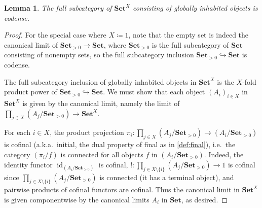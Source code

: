 \documentclass[11pt, oneside, article]{memoir}
\theoremstyle{plain}
\newtheorem{lemma}[theorem]{Lemma}
\theoremstyle{definition}
\theoremstyle{remark}
\DeclareMathOperator{\id}{id}
\newcommand{\bang}{\mathrm{!}}
\newcommand{\namedcat}[1]{\mathbf{#1}}
\newcommand{\Set}{\namedcat{Set}}
\newcommand{\setof}[1]{\{#1\}}
\newcommand{\xA}{A}
\newcommand{\xB}{B}
\newcommand{\xX}{X}
\begin{document}
\begin{lemma}\label{lem:setcodense}
  The full subcategory of $\Set^\xX$ consisting of globally inhabited objects is codense.
\end{lemma}
\begin{proof}
  For the special case where $\xX \coloneqq 1$, note that the empty
  set is indeed the canonical limit of $\Set_{>0} \to \Set$, where
  $\Set_{>0}$ is the full subcategory of $\Set$ consisting of nonempty
  sets, so the full subcategory inclusion
  $\Set_{>0} \hookrightarrow \Set$ is codense.

  The full subcategory inclusion of globally inhabited objects in
  $\Set^\xX$ is the $\xX$-fold product power of
  $\Set_{>0} \hookrightarrow \Set$. We must show that each object
  $(\xA_i)_{i \in \xX}$ in $\Set^\xX$ is given by the canonical limit,
  namely the limit of
  $\prod_{j \in \xX}(\xA_j/\Set_{>0}) \to \Set^{\xX}$.

  For each $i \in \xX$, the product projection
  $\pi_i \colon \prod_{j \in \xX}(\xA_j/\Set_{>0}) \to
  (\xA_i/\Set_{>0})$ is cofinal (a.k.a.\ initial, the dual property of
  final as in \cref{def:final}), i.e.\ the category $(\pi_i / f)$ is
  connected for all objects $f$ in $(\xA_i/\Set_{>0})$.
  Indeed, the identity functor $\id_{(\xA_i/\Set_{>0})}$ is cofinal,
  $\bang \colon \prod_{j \in \xX \setminus \setof{i}}(\xA_j/\Set_{>0})
  \to 1$ is cofinal since
  $\prod_{j \in \xX \setminus \setof{i}}(\xA_j/\Set_{>0})$ is
  connected (it has a terminal object), and pairwise products of
  cofinal functors are cofinal.  Thus the canonical limit in
  $\Set^\xX$ is given componentwise by the canonical limits $\xA_i$ in
  $\Set$, as desired.
\end{proof}
\end{document}
